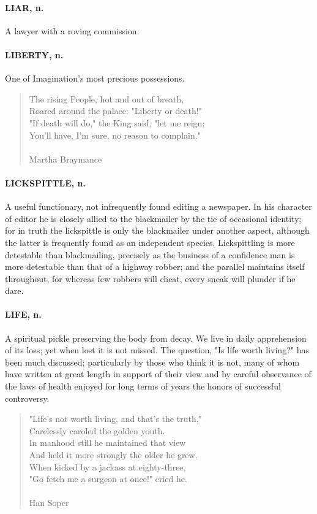 \documentclass[11pt]{article}
\begin{document}
\paragraph{LIAR, n.}  A lawyer with a roving commission.

\paragraph{LIBERTY, n.}  One of Imagination's most precious possessions.

\begin{quote}   The rising People, hot and out of breath, \\
  Roared around the palace:  "Liberty or death!" \\
  "If death will do," the King said, "let me reign; \\
  You'll have, I'm sure, no reason to complain." \\
 \\
Martha Braymance \end{quote}


\paragraph{LICKSPITTLE, n.}  A useful functionary, not infrequently found editing
a newspaper.  In his character of editor he is closely allied to the
blackmailer by the tie of occasional identity; for in truth the
lickspittle is only the blackmailer under another aspect, although the
latter is frequently found as an independent species.  Lickspittling
is more detestable than blackmailing, precisely as the business of a
confidence man is more detestable than that of a highway robber; and
the parallel maintains itself throughout, for whereas few robbers will
cheat, every sneak will plunder if he dare.

\paragraph{LIFE, n.}  A spiritual pickle preserving the body from decay.  We live
in daily apprehension of its loss; yet when lost it is not missed.
The question, "Is life worth living?" has been much discussed;
particularly by those who think it is not, many of whom have written
at great length in support of their view and by careful observance of
the laws of health enjoyed for long terms of years the honors of
successful controversy.

\begin{quote}   "Life's not worth living, and that's the truth," \\
  Carelessly caroled the golden youth. \\
  In manhood still he maintained that view \\
  And held it more strongly the older he grew. \\
  When kicked by a jackass at eighty-three, \\
  "Go fetch me a surgeon at once!" cried he. \\
 \\
Han Soper \end{quote}
\end{document}

